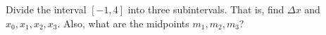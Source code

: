Divide the interval $[-1,4]$ into three subintervals.  That is, find $\Delta x$ and $x_0,x_1,x_2,x_3$.  Also, what are the midpoints $m_1,m_2,m_3$?
